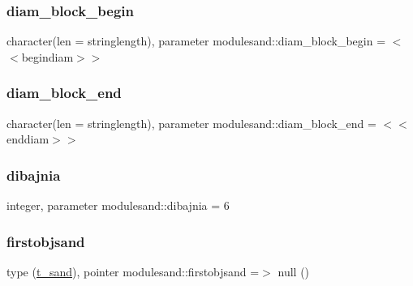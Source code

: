 \subsubsection{\texorpdfstring{diam\+\_\+block\+\_\+begin}{diam\_block\_begin}}
{\footnotesize\ttfamily character(len = stringlength), parameter modulesand\+::diam\+\_\+block\+\_\+begin = \textquotesingle{}$<$$<$begindiam$>$$>$\textquotesingle{}\hspace{0.3cm}{\ttfamily [private]}}

\mbox{\label{namespacemodulesand_a060d45bf13a22de07462deb2c0661360}} 
\subsubsection{\texorpdfstring{diam\+\_\+block\+\_\+end}{diam\_block\_end}}
{\footnotesize\ttfamily character(len = stringlength), parameter modulesand\+::diam\+\_\+block\+\_\+end = \textquotesingle{}$<$$<$enddiam$>$$>$\textquotesingle{}\hspace{0.3cm}{\ttfamily [private]}}

\mbox{\label{namespacemodulesand_a829fcd6465e28c43cfded2f7ed078b6c}} 
\subsubsection{\texorpdfstring{dibajnia}{dibajnia}}
{\footnotesize\ttfamily integer, parameter modulesand\+::dibajnia = 6\hspace{0.3cm}{\ttfamily [private]}}

\mbox{\label{namespacemodulesand_a7851dcaac94d974f7dde72bc2e32cb6f}} 
\subsubsection{\texorpdfstring{firstobjsand}{firstobjsand}}
{\footnotesize\ttfamily type (\mbox{\hyperlink{structmodulesand_1_1t__sand}{t\+\_\+sand}}), pointer modulesand\+::firstobjsand =$>$ null ()\hspace{0.3cm}{\ttfamily [private]}}

